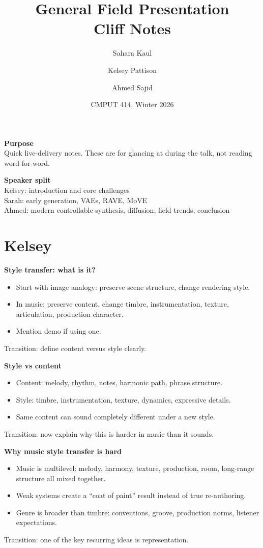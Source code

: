 \documentclass[11pt]{article}
\title{General Field Presentation\\Cliff Notes}
\author{Sahara Kaul \and Kelsey Pattison \and Ahmed Sajid}
\date{CMPUT 414, Winter 2026}
\begin{document}
\color{Ink}
\maketitle

\textbf{Purpose}\\
Quick live-delivery notes. These are for glancing at during the talk, not reading word-for-word.

\textbf{Speaker split}\\
Kelsey: introduction and core challenges\\
Sarah: early generation, VAEs, RAVE, MoVE\\
Ahmed: modern controllable synthesis, diffusion, field trends, conclusion

\section*{Kelsey}

\textbf{Style transfer: what is it?}
\begin{itemize}
\item Start with image analogy: preserve scene structure, change rendering style.
\item In music: preserve content, change timbre, instrumentation, texture, articulation, production character.
\item Mention demo if using one.
\end{itemize}
\textcolor{Muted}{Transition: define content versus style clearly.}

\textbf{Style vs content}
\begin{itemize}
\item Content: melody, rhythm, notes, harmonic path, phrase structure.
\item Style: timbre, instrumentation, texture, dynamics, expressive details.
\item Same content can sound completely different under a new style.
\end{itemize}
\textcolor{Muted}{Transition: now explain why this is harder in music than it sounds.}

\textbf{Why music style transfer is hard}
\begin{itemize}
\item Music is multilevel: melody, harmony, texture, production, room, long-range structure all mixed together.
\item Weak systems create a “coat of paint” result instead of true re-authoring.
\item Genre is broader than timbre: conventions, groove, production norms, listener expectations.
\end{itemize}
\textcolor{Muted}{Transition: one of the key recurring ideas is representation.}
\end{document}
